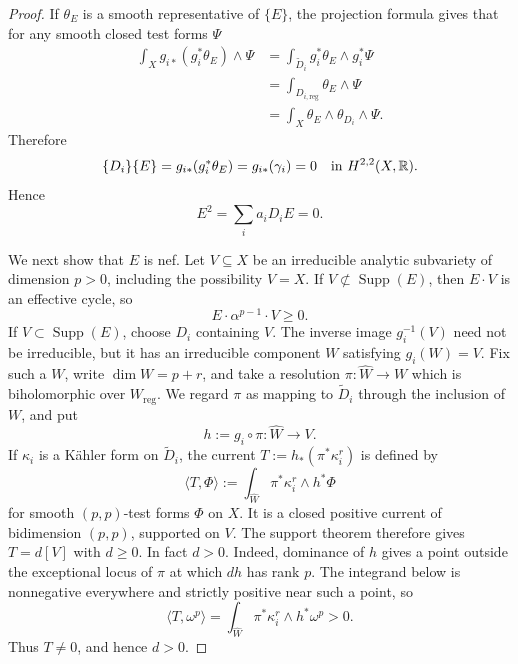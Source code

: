 \documentclass[reqno]{amsart}
\newcommand{\R}{\mathbb{R}}
\newcommand{\reg}{\mathrm{reg}}
\theoremstyle{plain}
\theoremstyle{remark}
\begin{document}
\begin{proof}
If \(\theta_E\) is a smooth representative of \(\{E\}\), the projection
formula gives that for any smooth closed test forms $\Psi$\[
\begin{aligned}
\int_X g_{i*}(g_i^*\theta_E)\wedge\Psi
&=\int_{\widetilde D_i}g_i^*\theta_E\wedge g_i^*\Psi\\
&=\int_{D_{i,\reg}}\theta_E\wedge\Psi\\
&=\int_X\theta_E\wedge\theta_{D_i}\wedge\Psi.
\end{aligned}
\]Therefore
\[
 \{D_i\}\{E\}
 =g_{i*}(g_i^*\theta_E)=g_{i*}(\gamma_i)=0
 \quad\hbox{in }H^{2,2}(X,\R).
\]
Hence
\begin{equation}\label{eq:E-square-zero}
 E^2=\sum_i a_iD_iE=0.
\end{equation}



We next show that $E$ is nef. Let $V\subseteq X$ be an irreducible
analytic subvariety of dimension $p>0$, including the possibility
$V=X$. If $V\not\subset\operatorname{Supp}(E)$, then $E\cdot V$ is an
effective cycle, so
\[
 E\cdot\alpha^{p-1}\cdot V\geq0.
\]
If $V\subset\operatorname{Supp}(E)$, choose $D_i$ containing $V$.
The inverse image $g_i^{-1}(V)$ need not be irreducible, but it has an
irreducible component $W$ satisfying $g_i(W)=V$. Fix such a
$W$, write $\dim W=p+r$, and take a resolution
$\pi:\widehat W\to W$ which is biholomorphic over $W_{\reg}$.
We regard $\pi$ as mapping to
$\widetilde D_i$ through the inclusion of $W$, and put
\[
 h:=g_i\circ\pi:\widehat W\longrightarrow V.
\]
If $\kappa_i$ is a K\"ahler form on $\widetilde D_i$, the current
$T:=h_*(\pi^*\kappa_i^r)$ is defined by
\[
 \langle T,\Phi\rangle
 :=\int_{\widehat W}\pi^*\kappa_i^r\wedge h^*\Phi
\]
for smooth $(p,p)$-test forms $\Phi$ on $X$.  It is a closed
positive current of bidimension $(p,p)$, supported on $V$.
The support theorem
\cite[Chapter~III, Corollary~(2.14)]{D12} therefore gives
$T=d[V]$ with $d\geq0$.  In fact $d>0$.  Indeed, dominance of
$h$ gives a point outside the exceptional locus of $\pi$ at which
$dh$ has rank $p$.  The integrand below is nonnegative everywhere
and strictly positive near such a point, so
\[
 \langle T,\omega^p\rangle
 =\int_{\widehat W}\pi^*\kappa_i^r\wedge h^*\omega^p>0.
\]
Thus $T\ne0$, and hence $d>0$.


\end{proof}
\end{document}
